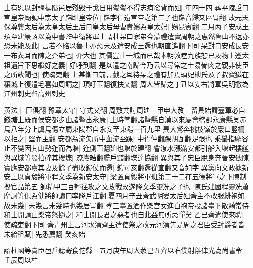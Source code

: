 士有恩以封疆褊隘邑居殘毁干戈日用鬱鬱不得志疽發背而殂|{
	年四十四}
葬平陵諡曰宣皇帝廟號中宗太子巋即皇帝位|{
	巋字仁遠宣帝之第三子也巋音歸又區胃翻}
改元天保尊龔太后為太皇太后王后曰皇太后母曹貴嬪為皇太妃|{
	嬪昆賓翻}
二月丙子安成王頊至建康詔以為中書監中衛將軍上謂杜杲曰家弟今蒙禮遣實周朝之惠然魯山不返亦恐未能及此|{
	言若不賂以魯山亦恐未及遣安成王還也朝直遙翻下同}
杲對曰安成長安一布衣耳而陳之介弟也|{
	介大也}
其價豈止一城而已哉本朝敦睦九族恕已及物上遵太祖遺旨下思繼好之義|{
	好呼到翻}
是以遣之南歸今乃云以尋常之土易骨肉之親非使臣之所敢聞也|{
	使疏吏翻}
上甚慚曰前言戲之耳待杲之禮有加焉頊妃柳氏及子叔寶猶在穰城上復遣毛喜如周請之|{
	頊吁玉翻復扶又翻}
周人皆歸之丁丑以安右將軍吳明徹為江州刺史督高州刺史

黄法|{
	巨俱翻}
豫章太守|{
	守式又翻}
周敷共討周廸　甲申大赦　留異始謂臺軍必自錢塘上既而侯安都步由諸暨出永康|{
	上時掌翻諸暨縣自漢以來屬會稽郡永康縣吳赤烏八年分上虞烏傷立屬東陽郡自永安至東陽一百九里}
異大驚奔桃枝嶺於巖口竪柵以拒之|{
	堅而主翻}
安都為流矢所中血流至踝|{
	中竹仲翻踝胡瓦翻足跟也}
乘轝指麾容止不變因其山勢迮而為堰|{
	迮側百翻廹也堰於建翻}
會潦水漲滿安都引船入堰起樓艦與異城等發拍碎其樓堞|{
	潦盧皓翻艦戶黯翻堞達協翻}
異與其子忠臣脫身奔晉安依陳寶應安都虜其妻及餘子盡收鎧仗而還|{
	鎧可亥翻還從宣翻又音如字}
異黨向文政據新安上以貞毅將軍程文季為新安太守|{
	梁置貞毅將軍班第二十二在五德將軍之下陳制擬官品第五}
帥精甲三百輕往攻之文政戰敗遂降文季靈洗之子也|{
	陳氏建國程靈洗蕭摩訶等俱為健將帥讀曰率降戶江翻}
夏四月辛丑齊武明婁太后殂齊主不改服緋袍如故未幾|{
	未幾言未幾時也幾居豈翻}
登三臺置酒作樂宫女進白袍帝投諸臺下散騎常侍和士開請止樂帝怒撾之|{
	和士開長君之惡者也自此益無所忌憚矣}
乙巳齊遣使來聘|{
	使疏吏翻下同}
齊青州上言河水清齊主遣使祭之改元河清先是周之君臣受封爵者皆未給租賦|{
	先悉薦翻}
癸亥始

詔柱國等貴臣邑戶聽寄食佗縣　五月庚午周大赦己丑齊以右僕射斛律光為尚書令　壬辰周以柱

